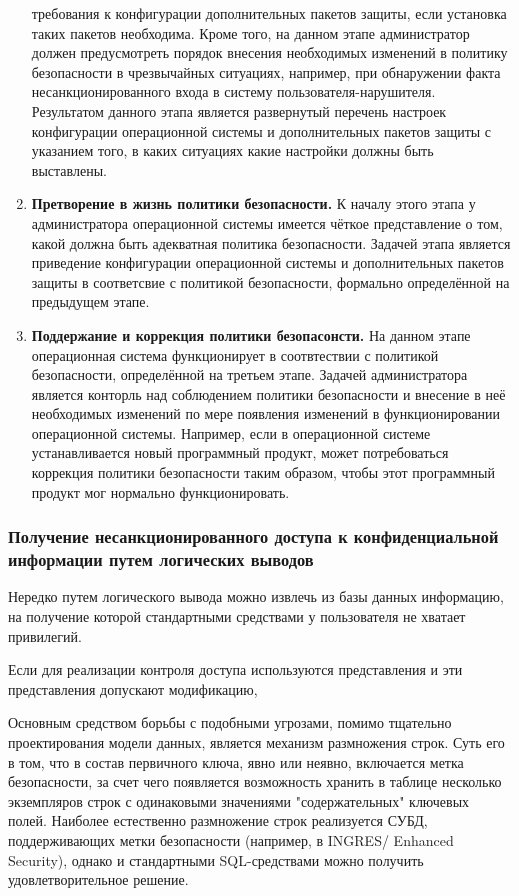 \begin{enumerate}
        требования к конфигурации дополнительных пакетов защиты, если установка таких пакетов
        необходима. Кроме того, на данном этапе администратор должен предусмотреть порядок внесения
        необходимых изменений в политику безопасности в чрезвычайных ситуациях, например, при
        обнаружении факта несанкционированного входа в систему пользователя-нарушителя. Результатом
        данного этапа является развернутый перечень настроек конфигурации операционной системы и
        дополнительных пакетов защиты с указанием того, в каких ситуациях какие настройки должны быть
        выставлены.
    \item \textbf{Претворение в жизнь политики безопасности.} К началу этого этапа у администратора
        операционной системы имеется чёткое представление о том, какой должна быть адекватная политика
        безопасности. Задачей этапа является приведение конфигурации операционной системы и
        дополнительных пакетов защиты в соответсвие с политикой безопасности, формально определённой
        на предыдущем этапе.
    \item \textbf{Поддержание и коррекция политики безопасонсти.} На данном этапе операционная
    система функционирует в соотвтествии с политикой безопасности, определённой на третьем этапе.
    Задачей администратора является конторль над соблюдением политики безопасности и внесение в неё
    необходимых изменений по мере появления изменений в функционировании операционной системы.
    Например, если в операционной системе устанавливается новый программный продукт, может
    потребоваться коррекция политики безопасности таким образом, чтобы этот программный продукт мог
    нормально функционировать.
\end{enumerate}


\subsubsection{Получение несанкционированного доступа к конфиденциальной информации путем логических выводов}
Нередко путем логического вывода можно извлечь из базы данных информацию, на получение которой
стандартными средствами у пользователя не хватает привилегий.

Если для реализации контроля доступа используются представления и эти представления допускают
модификацию,

Основным средством борьбы с подобными угрозами, помимо тщательно проектирования модели данных,
является механизм размножения строк. Суть его в том, что в состав первичного ключа, явно или неявно,
включается метка безопасности, за счет чего появляется возможность хранить в таблице несколько
экземпляров строк с одинаковыми значениями "содержательных" ключевых полей. Наиболее естественно
размножение строк реализуется  СУБД, поддерживающих метки безопасности (например, в INGRES/
Enhanced Security), однако и стандартными SQL-средствами можно получить удовлетворительное решение.

